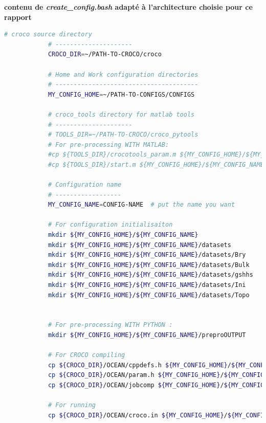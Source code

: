 \documentclass[10pt,a4paper,titlepage]{article}
\begin{document}
    \begin{codeEnv}{\textbf{contenu de \textit{create\_config.bash} adapté à l’architecture choisie pour ce rapport}}\label{create_config}
        \begin{lstlisting}[language=bash]
            # croco source directory
            # ---------------------
            CROCO_DIR=~/PATH-TO-CROCO/croco
            
            # Home and Work configuration directories
            # ---------------------------------------
            MY_CONFIG_HOME=~/PATH-TO-CONFIGS/CONFIGS
            
            # croco_tools directory for matlab tools
            # ---------------------
            # TOOLS_DIR=~/PATH-TO-CROCO/croco_pytools
            # For pre-processing WITH MATLAB:
            #cp ${TOOLS_DIR}/crocotools_param.m ${MY_CONFIG_HOME}/${MY_CONFIG_NAME}/
            #cp ${TOOLS_DIR}/start.m ${MY_CONFIG_HOME}/${MY_CONFIG_NAME}/
            
            # Configuration name
            # ------------------
            MY_CONFIG_NAME=CONFIG-NAME  # put the name you want
            
            # For configuration initialisaiton
            mkdir ${MY_CONFIG_HOME}/${MY_CONFIG_NAME}
            mkdir ${MY_CONFIG_HOME}/${MY_CONFIG_NAME}/datasets
            mkdir ${MY_CONFIG_HOME}/${MY_CONFIG_NAME}/datasets/Bry
            mkdir ${MY_CONFIG_HOME}/${MY_CONFIG_NAME}/datasets/Bulk
            mkdir ${MY_CONFIG_HOME}/${MY_CONFIG_NAME}/datasets/gshhs
            mkdir ${MY_CONFIG_HOME}/${MY_CONFIG_NAME}/datasets/Ini
            mkdir ${MY_CONFIG_HOME}/${MY_CONFIG_NAME}/datasets/Topo
            
            
            # For pre-processing WITH PYTHON :
            mkdir ${MY_CONFIG_HOME}/${MY_CONFIG_NAME}/preproOUTPUT
            
            # For CROCO compiling
            cp ${CROCO_DIR}/OCEAN/cppdefs.h ${MY_CONFIG_HOME}/${MY_CONFIG_NAME}/
            cp ${CROCO_DIR}/OCEAN/param.h ${MY_CONFIG_HOME}/${MY_CONFIG_NAME}/
            cp ${CROCO_DIR}/OCEAN/jobcomp ${MY_CONFIG_HOME}/${MY_CONFIG_NAME}/
            
            # For running
            cp ${CROCO_DIR}/OCEAN/croco.in ${MY_CONFIG_HOME}/${MY_CONFIG_NAME}/
            
        \end{lstlisting}
    \end{codeEnv}
    
\end{document}
